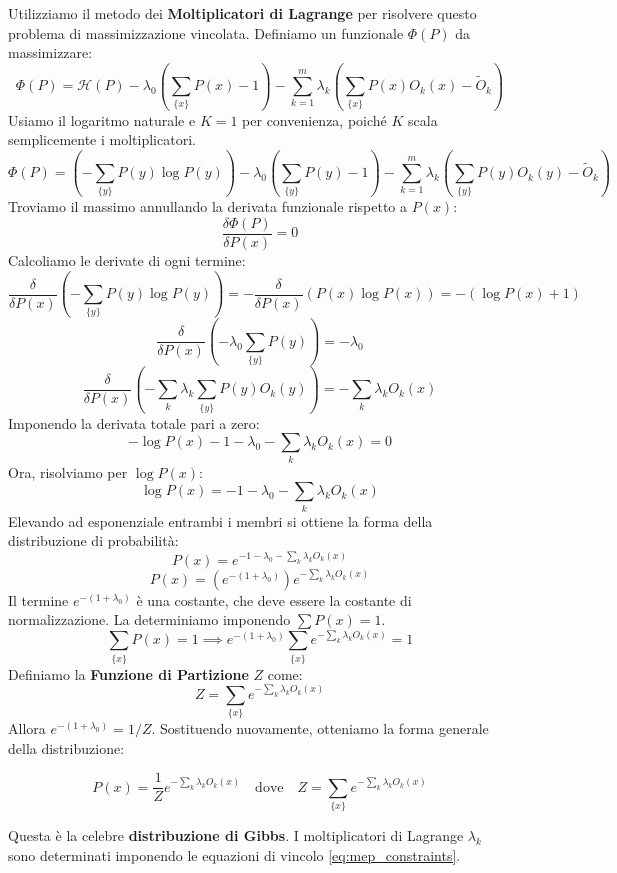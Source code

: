\begin{enumerate}
\noindent Utilizziamo il metodo dei \textbf{Moltiplicatori di Lagrange} per risolvere questo problema di massimizzazione vincolata. Definiamo un funzionale $\Phi(P)$ da massimizzare:
$$ \Phi(P) = \mathcal{H}(P) - \lambda_0 \left(\sum_{\{x\}} P(x) - 1\right) - \sum_{k=1}^m \lambda_k \left(\sum_{\{x\}} P(x) O_k(x) - \tilde{O}_k\right) $$
Usiamo il logaritmo naturale e $K=1$ per convenienza, poiché $K$ scala semplicemente i moltiplicatori.
$$ \Phi(P) = \left(-\sum_{\{y\}} P(y) \log P(y)\right) - \lambda_0 \left(\sum_{\{y\}} P(y) - 1\right) - \sum_{k=1}^m \lambda_k \left(\sum_{\{y\}} P(y) O_k(y) - \tilde{O}_k\right) $$
Troviamo il massimo annullando la derivata funzionale rispetto a $P(x)$:
$$ \frac{\delta \Phi(P)}{\delta P(x)} = 0 $$
Calcoliamo le derivate di ogni termine:
$$ \frac{\delta}{\delta P(x)} \left(-\sum_{\{y\}} P(y) \log P(y)\right) = - \frac{\delta}{\delta P(x)} (P(x) \log P(x)) = -(\log P(x) + 1) $$
$$ \frac{\delta}{\delta P(x)} \left(-\lambda_0 \sum_{\{y\}} P(y)\right) = -\lambda_0 $$
$$ \frac{\delta}{\delta P(x)} \left(-\sum_k \lambda_k \sum_{\{y\}} P(y) O_k(y)\right) = -\sum_k \lambda_k O_k(x) $$
Imponendo la derivata totale pari a zero:
$$ - \log P(x) - 1 - \lambda_0 - \sum_k \lambda_k O_k(x) = 0 $$
Ora, risolviamo per $\log P(x)$:
$$ \log P(x) = -1 - \lambda_0 - \sum_k \lambda_k O_k(x) $$
Elevando ad esponenziale entrambi i membri si ottiene la forma della distribuzione di probabilità:
$$ P(x) = e^{-1 - \lambda_0 - \sum_k \lambda_k O_k(x)} $$
$$ P(x) = \left(e^{-(1+\lambda_0)}\right) e^{-\sum_k \lambda_k O_k(x)} $$
Il termine $e^{-(1+\lambda_0)}$ è una costante, che deve essere la costante di normalizzazione. La determiniamo imponendo $\sum P(x) = 1$.
$$ \sum_{\{x\}} P(x) = 1 \implies e^{-(1+\lambda_0)} \sum_{\{x\}} e^{-\sum_k \lambda_k O_k(x)} = 1 $$
Definiamo la \textbf{Funzione di Partizione} $Z$ come:
\begin{equation}
    Z = \sum_{\{x\}} e^{-\sum_k \lambda_k O_k(x)}
    \label{eq:partition_function_mep}
\end{equation}
Allora $e^{-(1+\lambda_0)} = 1/Z$. Sostituendo nuovamente, otteniamo la forma generale della distribuzione:

\begin{tcolorbox}[colback=yellow!25, colframe=yellow!75!orange, coltitle=black, title=\textbf{Distribuzione del Principio di Massima Entropia (Forma di Gibbs)}]
\begin{equation}
    P(x) = \frac{1}{Z} e^{-\sum_k \lambda_k O_k(x)} \quad \text{dove} \quad Z = \sum_{\{x\}} e^{-\sum_k \lambda_k O_k(x)}
    \label{eq:mep_distribution}
\end{equation}
\end{tcolorbox}
Questa è la celebre \textbf{distribuzione di Gibbs}. I moltiplicatori di Lagrange $\lambda_k$ sono determinati imponendo le equazioni di vincolo \eqref{eq:mep_constraints}.



\end{enumerate}
